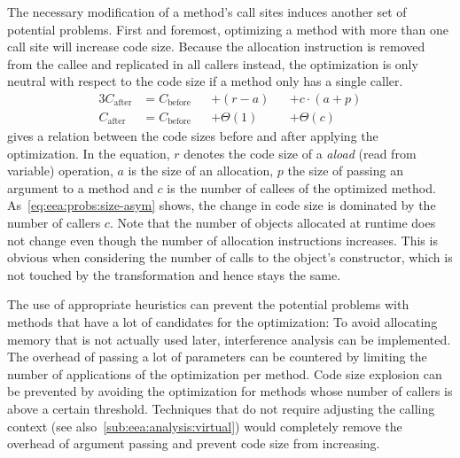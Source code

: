 		The necessary modification of a method's call sites induces another set of potential problems. First and foremost,
		optimizing a method with more than one call site will increase code size. Because the allocation instruction is
		removed from the callee and replicated in all callers instead, the optimization is only neutral with respect to the
		code size if a method only has a single caller.
		\begin{alignat}{3}
			C_\text{after}
				&= C_\text{before} &&+ (r - a)   &&+ c \cdot (a + p) \label{eq:eea:probs:size}\\
			C_\text{after}
				&= C_\text{before} &&+ \Theta(1) &&+ \Theta(c) \label{eq:eea:probs:size-asym}
		\end{alignat}
		 gives a relation between the code sizes before and after applying the optimization. In the
		equation, $r$ denotes the code size of a \emph{aload} (read from variable) operation, $a$ is the size of an
		allocation, $p$ the size of passing an argument to a method and $c$ is the number of callees of the optimized
		method. As~\cref{eq:eea:probs:size-asym} shows, the change in code size is dominated by the number of callers $c$.
		Note that the number of objects allocated at runtime does not change even though the number of allocation
		instructions increases. This is obvious when considering the number of calls to the object's constructor, which is
		not touched by the transformation and hence stays the same.

		The use of appropriate heuristics can prevent the potential problems with methods that have a lot of candidates for
		the optimization: To avoid allocating memory that is not actually used later, interference analysis can be
		implemented. The overhead of passing a lot of parameters can be countered by limiting the number of applications of
		the optimization per method. Code size explosion can be prevented by avoiding the optimization for methods whose
		number of callers is above a certain threshold. Techniques that do not require adjusting the calling context (see
		also~\cref{sub:eea:analysis:virtual}) would completely remove the overhead of argument passing and prevent code size
		from increasing.
